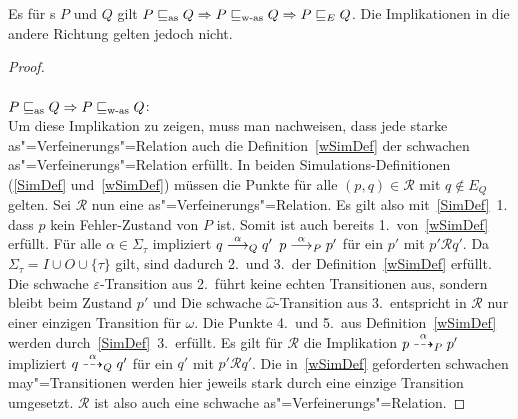 \begin{Satz}
  Es für \MEIO{}s $P$ und $Q$ gilt $P\sqsubseteq _{\mathrm{as}} Q\Rightarrow P\sqsubseteq _{\mathrm{w}\text{-}\mathrm{as}} Q\Rightarrow
  P \sqsubseteq  _E Q$. Die Implikationen in die andere Richtung gelten jedoch nicht.
\end{Satz}
\begin{proof}\mbox{}\\
  \\
  $P\sqsubseteq _{\mathrm{as}} Q\Rightarrow P\sqsubseteq _{\mathrm{w}\text{-}\mathrm{as}} Q$:\\
  Um diese Implikation zu zeigen, muss man nachweisen, dass jede starke
  as"=Verfeinerungs"=Relation auch die Definition~\ref{wSimDef} der schwachen
  as"=Verfeinerungs"=Relation erfüllt. In beiden Simulations-Definitionen
  (\ref{SimDef} und~\ref{wSimDef}) müssen die Punkte für alle $(p,q) \in
  \mathcal{R}$ mit $q\notin E_Q$ gelten. Sei $\mathcal{R}$ nun eine
  as"=Verfeinerungs"=Relation. Es gilt also mit~\ref{SimDef}~1.\, dass $p$ kein
  Fehler-Zustand von $P$ ist. Somit ist auch bereits 1.\ von~\ref{wSimDef}
  erfüllt. Für alle $\alpha\in\Sigma _{\tau}$ impliziert $q\must[\alpha]_Q q'$
  $p\must[\alpha]_P p'$ für ein $p'$ mit $p'\mathcal{R} q'$. Da $\Sigma
  _{\tau} = I \cup O \cup \{\tau\}$ gilt, sind dadurch 2.\ und 3.\ der
  Definition~\ref{wSimDef} erfüllt. Die schwache $\varepsilon$-Transition aus
  2.\ führt keine echten Transitionen aus, sondern bleibt beim Zustand $p'$ und
  Die schwache $\hat{\omega}$-Transition aus 3.\ entspricht in $\mathcal{R}$
  nur einer einzigen Transition für $\omega$. Die Punkte 4.\ und 5.\ aus
  Definition~\ref{wSimDef} werden durch~\ref{SimDef}~3.\ erfüllt. Es gilt für
  $\mathcal{R}$ die Implikation $p\may[\alpha]_P p'$ impliziert $q
  \may[\alpha]_Q q'$ für ein $q'$ mit $p'\mathcal{R}q'$. Die in~\ref{wSimDef}
  geforderten schwachen may"=Transitionen werden hier jeweils stark durch eine
  einzige Transition umgesetzt. $\mathcal{R}$ ist also auch eine schwache
  as"=Verfeinerungs"=Relation.


\end{proof}
